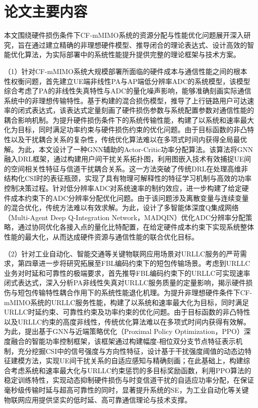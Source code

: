 \section{论文主要内容}

本文围绕硬件损伤条件下CF-mMIMO系统的资源分配与性能优化问题展开深入研究，旨在通过建立精确的非理想硬件模型、推导闭合的理论表达式、设计高效的智能优化算法，为实际部署中的系统性能提升提供完整的理论框架与技术方案。

（1）针对CF-mMIMO系统大规模部署所面临的硬件成本与通信性能之间的根本性权衡问题，首先建立UE端非线性PA与AP端低分辨率ADC的系统模型，该模型综合考虑了PA的非线性失真特性与ADC的量化噪声影响，能够准确刻画实际通信系统中的非理想传输特性。基于构建的混合损伤模型，推导了上行链路用户可达速率的闭式表达式，该表达式定量刻画了硬件损伤参数与系统配置参数对通信性能的耦合影响机制。为提升硬件损伤条件下的系统传输性能，构建了以系统和速率最大化为目标，同时满足功率约束与硬件损伤约束的优化问题。由于目标函数的非凸特性以及干扰耦合关系的复杂性，传统优化算法难以在多项式时间内获得全局最优解。为此，本文设计了一种GNN辅助的Actor-Critic功率分配算法。该算法将GNN融入DRL框架，通过构建用户间干扰关系拓扑图，利用图嵌入技术有效捕捉UE间的空间相关性特征与信道干扰耦合关系。这一方法突破了传统DRL在处理高维非结构化CSI时的表征瓶颈，实现了具有物理可解释性的特征学习机制与高效的功率控制决策过程。针对低分辨率ADC对系统速率的制约效应，进一步构建了给定硬件成本约束下的ADC分辨率分配优化问题。由于该问题涉及离散变量与连续变量的混合优化，传统方法难以有效求解。为此，设计了多智能体深度Q集成网络（Multi-Agent Deep Q-Integration Network，MADQIN）优化ADC分辨率分配策略，通过协同优化各接入点的量化比特配置，在给定硬件成本约束下实现系统整体性能的最大化，从而达成硬件资源与通信性能的联合优化目标。

（2）针对工业自动化、智能交通等关键物联网应用场景对URLLC服务的严苛需求，第四章进一步将研究拓展至FBL编码约束下的短包传输场景。考虑到URLLC业务对时延和可靠性的极端要求，首先推导FBL编码约束下的URLLC可实现速率闭式表达式，深入分析PA非线性失真对URLLC服务质量的定量影响，揭示硬件损伤与短包传输特性耦合作用下的系统性能退化机理。为提升非理想硬件条件下CF-mMIMO系统的URLLC服务性能，构建了以系统和速率最大化为目标，同时满足URLLC时延约束、可靠性约束及功率约束的优化问题。由于目标函数的非凸特性以及URLLC约束的高度非线性，传统优化算法难以在多项式时间内获得有效解。为此，提出基于GNN与近端策略优化（Proximal Policy Optimization，PPO）深度融合的智能功率控制框架，该框架通过构建幅度-相位双分支节点特征表示机制，充分挖掘CSI中的信号强度与方向性特征，设计基于干扰强度阈值的动态边特征建模方法，实现UE间干扰关系的自适应感知与精确刻画；在此基础上，构建综合考虑系统和速率最大化与URLLC约束惩罚的多目标奖励函数，利用PPO算法的稳定训练特性，实现动态抑制硬件损伤与时变信道干扰的自适应功率分配，在保证毫秒级传输时延与超高可靠性的同时，显著提升系统的SE，为工业自动化等关键物联网应用提供坚实的低时延、高可靠通信理论与技术支撑。

